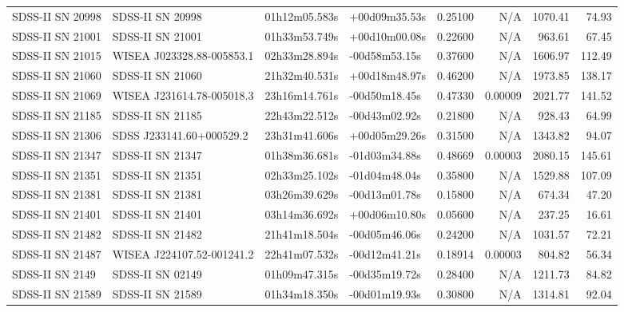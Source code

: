 \begin{longtable}{llllrrrr}
SDSS-II SN 20998 &                SDSS-II SN 20998 &   01h12m05.583s &   +00d09m35.53s &  0.25100 &      N/A &  1070.41 &       74.93 \\
SDSS-II SN 21001 &                SDSS-II SN 21001 &   01h33m53.749s &   +00d10m00.08s &  0.22600 &      N/A &   963.61 &       67.45 \\
SDSS-II SN 21015 &       WISEA J023328.88-005853.1 &   02h33m28.894s &   -00d58m53.15s &  0.37600 &      N/A &  1606.97 &      112.49 \\
SDSS-II SN 21060 &                SDSS-II SN 21060 &   21h32m40.531s &   +00d18m48.97s &  0.46200 &      N/A &  1973.85 &      138.17 \\
SDSS-II SN 21069 &       WISEA J231614.78-005018.3 &   23h16m14.761s &   -00d50m18.45s &  0.47330 &  0.00009 &  2021.77 &      141.52 \\
SDSS-II SN 21185 &                SDSS-II SN 21185 &   22h43m22.512s &   -00d43m02.92s &  0.21800 &      N/A &   928.43 &       64.99 \\
SDSS-II SN 21306 &        SDSS J233141.60+000529.2 &   23h31m41.606s &   +00d05m29.26s &  0.31500 &      N/A &  1343.82 &       94.07 \\
SDSS-II SN 21347 &                SDSS-II SN 21347 &   01h38m36.681s &   -01d03m34.88s &  0.48669 &  0.00003 &  2080.15 &      145.61 \\
SDSS-II SN 21351 &                SDSS-II SN 21351 &   02h33m25.102s &   -01d04m48.04s &  0.35800 &      N/A &  1529.88 &      107.09 \\
SDSS-II SN 21381 &                SDSS-II SN 21381 &   03h26m39.629s &   -00d13m01.78s &  0.15800 &      N/A &   674.34 &       47.20 \\
SDSS-II SN 21401 &                SDSS-II SN 21401 &   03h14m36.692s &   +00d06m10.80s &  0.05600 &      N/A &   237.25 &       16.61 \\
SDSS-II SN 21482 &                SDSS-II SN 21482 &   21h41m18.504s &   -00d05m46.06s &  0.24200 &      N/A &  1031.57 &       72.21 \\
SDSS-II SN 21487 &       WISEA J224107.52-001241.2 &   22h41m07.532s &   -00d12m41.21s &  0.18914 &  0.00003 &   804.82 &       56.34 \\
SDSS-II SN 2149  &                SDSS-II SN 02149 &   01h09m47.315s &   -00d35m19.72s &  0.28400 &      N/A &  1211.73 &       84.82 \\
SDSS-II SN 21589 &                SDSS-II SN 21589 &   01h34m18.350s &   -00d01m19.93s &  0.30800 &      N/A &  1314.81 &       92.04 \\

\end{longtable}
